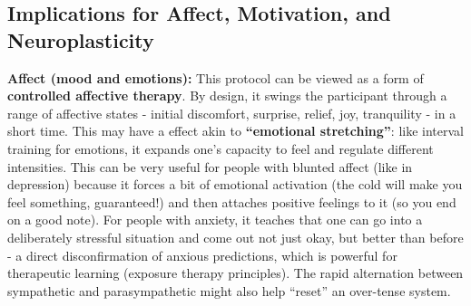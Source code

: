 \documentclass[11pt]{article}
\newcommand{\quotes}[1]{``#1''}
\begin{document}
\subsection{Implications for Affect, Motivation, and Neuroplasticity}

\textbf{Affect (mood and emotions):} This protocol can be viewed as a form of \textbf{controlled affective therapy}. By design, it swings the participant through a range of affective states - initial discomfort, surprise, relief, joy, tranquility - in a short time. This may have a effect akin to \textbf{\quotes{emotional stretching}}: like interval training for emotions, it expands one's capacity to feel and regulate different intensities. This can be very useful for people with blunted affect (like in depression) because it forces a bit of emotional activation (the cold will make you feel something, guaranteed!) and then attaches positive feelings to it (so you end on a good note). For people with anxiety, it teaches that one can go into a deliberately stressful situation and come out not just okay, but better than before - a direct disconfirmation of anxious predictions, which is powerful for therapeutic learning (exposure therapy principles). The rapid alternation between sympathetic and parasympathetic might also help \quotes{reset} an over-tense system.
\end{document}

